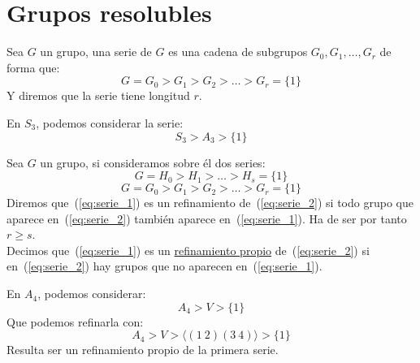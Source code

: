 \chapter{Grupos resolubles} %
\begin{definicion}
    Sea $G$ un grupo, una serie de $G$ es una cadena de subgrupos $G_0,G_1,\ldots, G_r$ de forma que:
    \begin{equation*}
        G = G_0 > G_1 > G_2 > \ldots > G_r = \{1\}
    \end{equation*}
    Y diremos que la serie tiene longitud $r$.
\end{definicion}

\begin{ejemplo}
    En $S_3$, podemos considerar la serie:
    \begin{equation*}
        S_3 > A_3 > \{1\}
    \end{equation*}
\end{ejemplo}

\begin{definicion}[Refinamiento]
    Sea $G$ un grupo, si consideramos sobre él dos series:
    \begin{equation}\label{eq:serie_2}
        G = H_0 > H_1 > \ldots > H_s = \{1\}
    \end{equation}
    \begin{equation}\label{eq:serie_1}
        G = G_0 > G_1 > G_2 > \ldots > G_r = \{1\}
    \end{equation}
    Diremos que~(\ref{eq:serie_1}) es un refinamiento de~(\ref{eq:serie_2}) si todo grupo que aparece en~(\ref{eq:serie_2}) también aparece en~(\ref{eq:serie_1}). Ha de ser por tanto $r\geq s$.\\

    \noindent
    Decimos que~(\ref{eq:serie_1}) es un \underline{refinamiento propio} de~(\ref{eq:serie_2}) si en~(\ref{eq:serie_2}) hay grupos que no aparecen en~(\ref{eq:serie_1}).
\end{definicion}

\begin{ejemplo}
    En $A_4$, podemos considerar:
    \begin{equation*}
        A_4 > V > \{1\}
    \end{equation*}
    Que podemos refinarla con:
    \begin{equation*}
        A_4 > V > \langle (1\ 2)(3\ 4) \rangle > \{1\}
    \end{equation*}
    Resulta ser un refinamiento propio de la primera serie.
\end{ejemplo}

